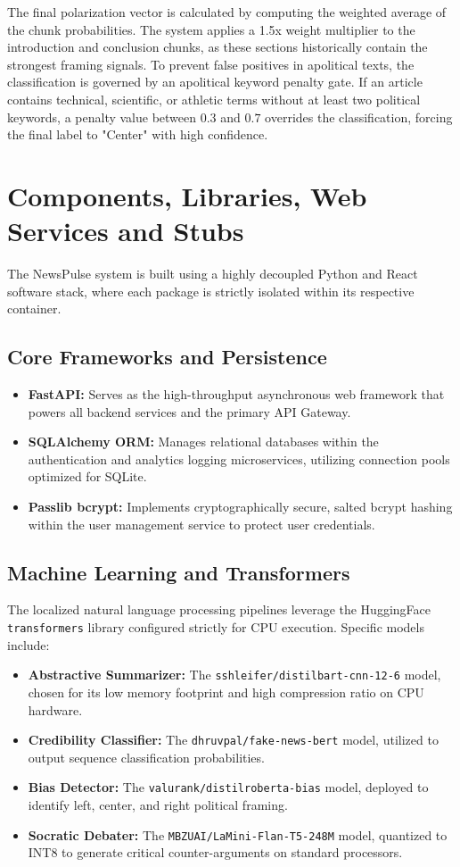 The final polarization vector is calculated by computing the weighted average of the chunk probabilities. The system applies a 1.5x weight multiplier to the introduction and conclusion chunks, as these sections historically contain the strongest framing signals. To prevent false positives in apolitical texts, the classification is governed by an apolitical keyword penalty gate. If an article contains technical, scientific, or athletic terms without at least two political keywords, a penalty value between $0.3$ and $0.7$ overrides the classification, forcing the final label to "Center" with high confidence.

\section{Components, Libraries, Web Services and Stubs}
The NewsPulse system is built using a highly decoupled Python and React software stack, where each package is strictly isolated within its respective container.

\subsection{Core Frameworks and Persistence}
\begin{itemize}
    \item \textbf{FastAPI:} Serves as the high-throughput asynchronous web framework that powers all backend services and the primary API Gateway.
    \item \textbf{SQLAlchemy ORM:} Manages relational databases within the authentication and analytics logging microservices, utilizing connection pools optimized for SQLite.
    \item \textbf{Passlib bcrypt:} Implements cryptographically secure, salted bcrypt hashing within the user management service to protect user credentials.
\end{itemize}

\subsection{Machine Learning and Transformers}
The localized natural language processing pipelines leverage the HuggingFace \texttt{transformers} library configured strictly for CPU execution. Specific models include:
\begin{itemize}
    \item \textbf{Abstractive Summarizer:} The \texttt{sshleifer/distilbart-cnn-12-6} model, chosen for its low memory footprint and high compression ratio on CPU hardware.
    \item \textbf{Credibility Classifier:} The \texttt{dhruvpal/fake-news-bert} model, utilized to output sequence classification probabilities.
    \item \textbf{Bias Detector:} The \texttt{valurank/distilroberta-bias} model, deployed to identify left, center, and right political framing.
    \item \textbf{Socratic Debater:} The \texttt{MBZUAI/LaMini-Flan-T5-248M} model, quantized to INT8 to generate critical counter-arguments on standard processors.
\end{itemize}

